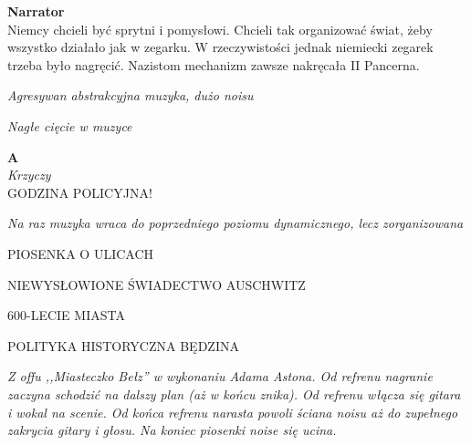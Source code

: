 \documentclass[11pt,a4paper,oneside]{article}
\begin{document}
\textbf{Narrator}\\
Niemcy chcieli być sprytni i pomysłowi. Chcieli tak organizować świat, 
żeby wszystko działało jak w zegarku. W rzeczywistości jednak niemiecki 
zegarek trzeba było nagręcić. Nazistom mechanizm zawsze nakręcała
II Pancerna. 

{\color{light-gray} \emph{Agresywan abstrakcyjna muzyka, dużo noisu}}

{\color{light-gray} \emph{Nagłe cięcie w muzyce}}

\textbf{A}\\
{\color{light-gray} \emph{Krzyczy}}\\
GODZINA POLICYJNA!

{\color{light-gray} \emph{Na raz muzyka wraca do poprzedniego poziomu
dynamicznego, lecz zorganizowana}}

{\color{red}
PIOSENKA O ULICACH

NIEWYSŁOWIONE ŚWIADECTWO AUSCHWITZ

600-LECIE MIASTA

POLITYKA HISTORYCZNA BĘDZINA
}

{\color{light-gray} \emph{Z offu ,,Miasteczko Bełz'' w wykonaniu Adama Astona. Od refrenu nagranie zaczyna schodzić na dalszy plan (aż w końcu znika). Od refrenu włącza się gitara i wokal na scenie. Od końca refrenu narasta powoli ściana noisu aż do zupełnego zakrycia gitary i głosu. Na koniec piosenki noise się ucina.}}
\end{document}
